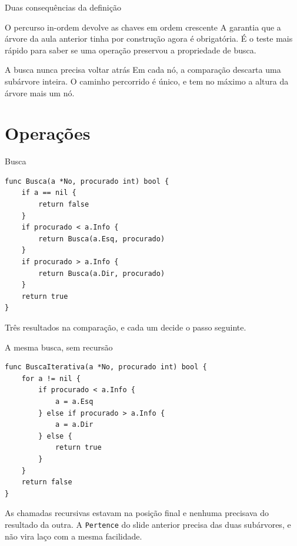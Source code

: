 \documentclass{beamer}
\begin{document}
\begin{frame}{Duas consequências da definição}
  \begin{block}{O percurso in-ordem devolve as chaves em ordem crescente}
    A garantia que a árvore da aula anterior tinha por construção agora é
    obrigatória. É o teste mais rápido para saber se uma operação preservou a
    propriedade de busca.
  \end{block}

  \begin{block}{A busca nunca precisa voltar atrás}
    Em cada nó, a comparação descarta uma subárvore inteira. O caminho
    percorrido é único, e tem no máximo a altura da árvore mais um nó.
  \end{block}
\end{frame}

\section{Operações}

\begin{frame}[fragile]{Busca}
\begin{verbatim}
func Busca(a *No, procurado int) bool {
	if a == nil {
		return false
	}
	if procurado < a.Info {
		return Busca(a.Esq, procurado)
	}
	if procurado > a.Info {
		return Busca(a.Dir, procurado)
	}
	return true
}
\end{verbatim}

  \vspace{0.2cm}
  Três resultados na comparação, e cada um decide o passo seguinte.
\end{frame}

\begin{frame}[fragile]{A mesma busca, sem recursão}
\begin{verbatim}
func BuscaIterativa(a *No, procurado int) bool {
	for a != nil {
		if procurado < a.Info {
			a = a.Esq
		} else if procurado > a.Info {
			a = a.Dir
		} else {
			return true
		}
	}
	return false
}
\end{verbatim}

  \vspace{0.2cm}
  As chamadas recursivas estavam na posição final e nenhuma precisava do
  resultado da outra. A \texttt{Pertence} do slide anterior precisa das duas
  subárvores, e não vira laço com a mesma facilidade.
\end{frame}
\end{document}
